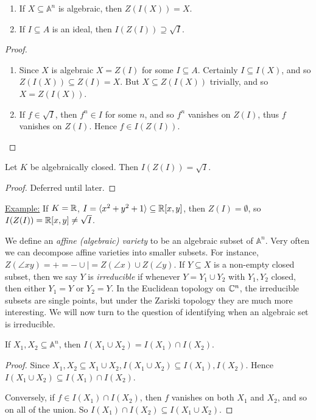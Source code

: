 \documentclass[10pt,a4paper]{article}
\begin{document}
\begin{proposition}
\item
\begin{enumerate}
\item If $X \subseteq \mathbb{A}^n$ is algebraic, then $Z(I(X)) = X$.
\item If $I \subseteq A$ is an ideal, then $I(Z(I)) \supseteq \sqrt{I}$.
\end{enumerate}
\end{proposition}
\begin{proof}
\item
\begin{enumerate}
\item Since $X$ is algebraic $X = Z(I)$ for some $I \subseteq A$. Certainly $I \subseteq I(X)$, and so $Z(I(X)) \subseteq Z(I) = X$. But $X \subseteq Z(I(X))$ trivially, and so $X = Z(I(X))$.

\item If $f \in \sqrt{I}$, then $f^n \in I$ for some $n$, and so $f^n$ vanishes on $Z(I)$, thus $f$ vanishes on $Z(I)$. Hence $f \in I(Z(I))$.
\end{enumerate}
\end{proof}
\begin{theorem}
Let $K$ be algebraically closed. Then $I(Z(I)) = \sqrt{I}$.
\end{theorem}
\begin{proof}
Deferred until later.
\end{proof}

\hspace*{-1em}\underline{Example:} If $K = \mathbb{R}$, $I = \langle x^2+y^2+1 \rangle \subseteq \mathbb{R}[x,y]$, then $Z(I) = \emptyset$, so $I(Z(I)) = \mathbb{R}[x,y] \neq \sqrt{I}$.

\hspace*{-1em}We define an \emph{affine (algebraic) variety} to be an algebraic subset of $\mathbb{A}^n$. Very often we can decompose affine varieties into smaller subsets. For instance, $Z(\angle{xy}) = + = - \cup | = Z(\angle{x}) \cup Z(\angle{y})$. If $Y \subseteq X$ is a non-empty closed subset, then we say $Y$ is \emph{irreducible} if whenever $Y = Y_1 \cup Y_2$ with $Y_1, Y_2$ closed, then either $Y_1 = Y$ or $Y_2 = Y$.  In the Euclidean topology on $\mathbb{C}^n$, the irreducible subsets are single points, but under the Zariski topology they are much more interesting. We will now turn to the question of identifying when an algebraic set is irreducible.

\begin{proposition}
If $X_1, X_2 \subseteq \mathbb{A}^n$, then $I(X_1 \cup X_2) = I(X_1) \cap I(X_2)$.
\end{proposition}
\begin{proof}
Since $X_1, X_2 \subseteq X_1 \cup X_2, I(X_1 \cup X_2) \subseteq I(X_1), I(X_2)$. Hence $I(X_1 \cup X_2) \subseteq I(X_1) \cap I(X_2)$.

Conversely, if $f \in I(X_1) \cap I(X_2)$, then $f$ vanishes on both $X_1$ and $X_2$, and so on all of the union. So $I(X_1) \cap I(X_2) \subseteq I(X_1 \cup X_2)$.
\end{proof}
\end{document}
